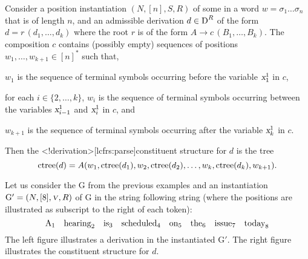 \documentclass[../../document.tex]{subfiles}
\begin{document}
    \begin{definition}
        Consider a position instantiation \((N, [n], S, R)\) of some  in a word \(w = \sigma_1 \ldots \sigma_n\) that is of length \(n\), and an admissible derivation \(d \in \operatorname{D}^R\) of the form \(d = r\,(d_1, \ldots, d_k)\) where the root \(r\) is of the form \(A \to c\,(B_1, \ldots, B_k)\).
        The composition \(c\) contains (possibly empty) sequences of positions \(w_1, \ldots, w_{k+1} \in [n]^*\) such that,
        \begin{compactitem}
                \item \(w_1\) is the sequence of terminal symbols occurring before the variable \(\textsl{x}_1^1\) in \(c\),
                \item for each \(i \in \{2, \ldots, k\}\), \(w_i\) is the sequence of terminal symbols occurring between the variables \(\textsl{x}_{i-1}^1\) and \(\textsl{x}_i^1\) in \(c\), and
                \item \(w_{k+1}\) is the sequence of terminal symbols occurring after the variable \(\textsl{x}_k^1\) in \(c\).
            \end{compactitem}
        Then the <\lcfrs!derivation>[lcfrs:parse]{constituent structure} for \(d\) is the tree \[
            \operatorname{ctree}(d) = A(w_1, \operatorname{ctree}(d_1), w_2, \operatorname{ctree}(d_2), \ldots, w_k, \operatorname{ctree}(d_k), w_{k+1}) \text{.}
        \]
    \end{definition}

    \label{ex:lcfrs:instance}
    Let us consider the  \(\mathrm{G}\) from the previous examples and an instantiation \(\mathrm{G'} = (N, [8], \textsc{\textsl{v}}, R)\) of \(\mathrm{G}\) in the string following string (where the positions are illustrated as subscript to the right of each token): \[
        \text{A}_1 \quad \text{hearing}_2 \quad \text{is}_3 \quad \text{scheduled}_4 \quad \text{on}_5 \quad \text{the}_6 \quad \text{issue}_7 \quad \text{today}_8
    \]
    The left figure illustrates a derivation in the instantiated  \(\mathrm{G'}\).
    The right figure illustrates the constituent structure for \(d\).
\end{document}
